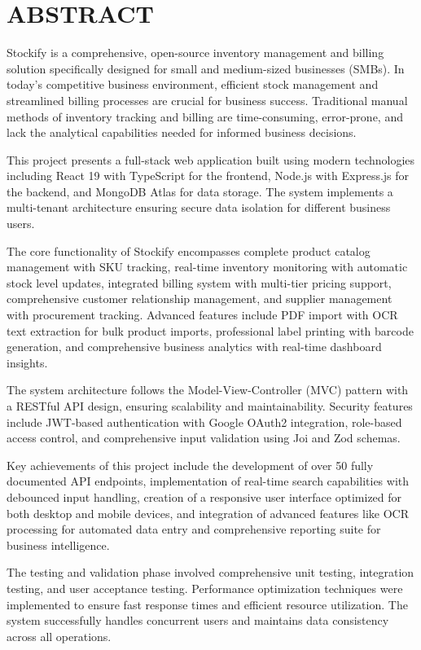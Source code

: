\chapter*{ABSTRACT}

Stockify is a comprehensive, open-source inventory management and billing solution specifically designed for small and medium-sized businesses (SMBs). In today's competitive business environment, efficient stock management and streamlined billing processes are crucial for business success. Traditional manual methods of inventory tracking and billing are time-consuming, error-prone, and lack the analytical capabilities needed for informed business decisions.

This project presents a full-stack web application built using modern technologies including React 19 with TypeScript for the frontend, Node.js with Express.js for the backend, and MongoDB Atlas for data storage. The system implements a multi-tenant architecture ensuring secure data isolation for different business users.

The core functionality of Stockify encompasses complete product catalog management with SKU tracking, real-time inventory monitoring with automatic stock level updates, integrated billing system with multi-tier pricing support, comprehensive customer relationship management, and supplier management with procurement tracking. Advanced features include PDF import with OCR text extraction for bulk product imports, professional label printing with barcode generation, and comprehensive business analytics with real-time dashboard insights.

The system architecture follows the Model-View-Controller (MVC) pattern with a RESTful API design, ensuring scalability and maintainability. Security features include JWT-based authentication with Google OAuth2 integration, role-based access control, and comprehensive input validation using Joi and Zod schemas.

Key achievements of this project include the development of over 50 fully documented API endpoints, implementation of real-time search capabilities with debounced input handling, creation of a responsive user interface optimized for both desktop and mobile devices, and integration of advanced features like OCR processing for automated data entry and comprehensive reporting suite for business intelligence.

The testing and validation phase involved comprehensive unit testing, integration testing, and user acceptance testing. Performance optimization techniques were implemented to ensure fast response times and efficient resource utilization. The system successfully handles concurrent users and maintains data consistency across all operations.

